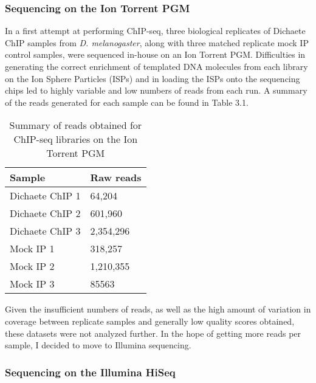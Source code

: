 \subsubsection{Sequencing on the Ion Torrent PGM}
In a first attempt at performing ChIP-seq, three biological replicates of Dichaete ChIP samples from \emph{D. melanogaster}, along with three matched replicate mock IP control samples, were sequenced in-house on an Ion Torrent PGM. Difficulties in generating the correct enrichment of templated DNA molecules from each library on the Ion Sphere Particles (ISPs) and in loading the ISPs onto the sequencing chips led to highly variable and low numbers of reads from each run. A summary of the reads generated for each sample can be found in Table 3.1.
 
\begin{table}[h]
\centering
\begin{tabular}{|l|l|}
\hline
\textbf{Sample}          & \textbf{Raw reads} \\ \hline
Dichaete ChIP 1 & 64,204    \\ \hline
Dichaete ChIP 2 & 601,960   \\ \hline
Dichaete ChIP 3 & 2,354,296 \\ \hline
Mock IP 1       & 318,257   \\ \hline
Mock IP 2       & 1,210,355 \\ \hline
Mock IP 3       & 85563    \\ \hline
\end{tabular}
\caption{Summary of reads obtained for ChIP-seq libraries on the Ion Torrent PGM}
\label{Table 3.1}
\end{table}

Given the insufficient numbers of reads, as well as the high amount of variation in coverage between replicate samples and generally low quality scores obtained, these datasets were not analyzed further. In the hope of getting more reads per sample, I decided to move to Illumina sequencing.

\subsubsection{Sequencing on the Illumina HiSeq}

